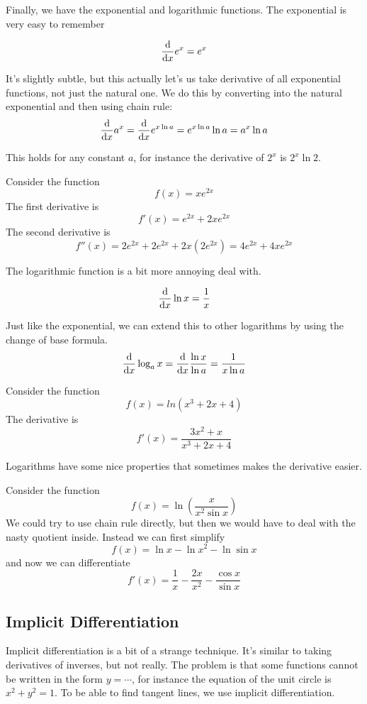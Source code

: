 Finally, we have the exponential and logarithmic functions. The exponential is very easy to remember

\begin{theorem}
	\[ \dv{x} e^x = e^x \]
\end{theorem}

It's slightly subtle, but this actually let's us take derivative of all exponential functions, not just the natural one. We do this by converting into the natural exponential and then using chain rule:
\[ \dv{x} a^x = \dv{x} e^{x \ln a} =  e^{x \ln a} \ln a = a^x \ln a \]

This holds for any constant $a$, for instance the derivative of $2^x$ is $2^x \ln 2$.

\begin{example}
	Consider the function
	\[ f(x) = x e^{2x} \]
	The first derivative is
	\[ f'(x) = e^{2x} + 2x e^{2x} \]
	The second derivative is 
	\[ f''(x) = 2 e^{2x} + 2e^{2x} + 2x (2e^{2x}) = 4 e^{2x} + 4x e^{2x} \]
\end{example}

The logarithmic function is a bit more annoying deal with.

\begin{theorem}
	\[ \dv{x} \ln x = \frac{1}{x} \]
\end{theorem}

Just like the exponential, we can extend this to other logarithms by using the change of base formula.
\[ \dv{x} \log_a x = \dv{x} \frac{\ln x}{\ln a} = \frac{1}{x \ln a} \]

\begin{example}
	Consider the function
	\[ f(x) = ln(x^3 + 2x + 4) \]
	The derivative is
	\[ f'(x) = \frac{3x^2 + x}{x^3 + 2x + 4} \]
\end{example}

Logarithms have some nice properties that sometimes makes the derivative easier.

\begin{example}
	Consider the function
	\[ f(x) = \ln(\frac{x}{x^2 \sin x}) \]
	We could try to use chain rule directly, but then we would have to deal with the nasty quotient inside. Instead we can first simplify
	\[ f(x) = \ln x - \ln x^2 - \ln \sin x \]
	and now we can differentiate
	\[ f'(x) = \frac{1}{x} - \frac{2x}{x^2} - \frac{\cos x}{\sin x} \]
\end{example}

\newpage 
\subsection{Implicit Differentiation}
Implicit differentiation is a bit of a strange technique. It's similar to taking derivatives of inverses, but not really. The problem is that some functions cannot be written in the form $y = \cdots$, for instance the equation of the unit circle is $x^2 + y^2 = 1$. To be able to find tangent lines, we use implicit differentiation. 

